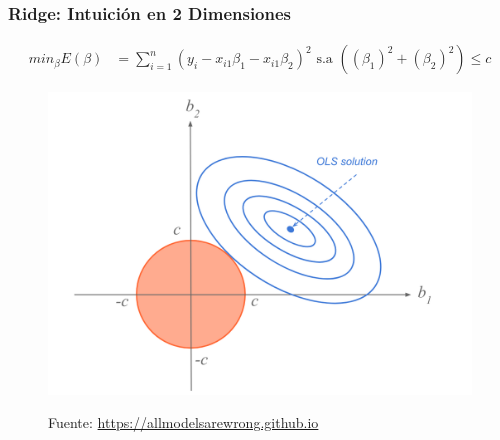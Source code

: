 \documentclass[
  shownotes,
  xcolor={svgnames},
  hyperref={colorlinks,citecolor=DarkBlue,linkcolor=andesred,urlcolor=DarkBlue}
  , aspectratio=169]{beamer}
\begin{document}
\begin{frame}[fragile]
\frametitle{Ridge: Intuición en 2 Dimensiones }

\begin{align}
     min_{\beta} E(\beta) &= \sum_{i=1}^n (y_i - x_{i1}\beta_1 - x_{i1}\beta_2)^2  \text{ s.a }   \left( (\beta_1)^2 + (\beta_2)^2 \right) \leq c 
  \end{align}

\begin{figure}[H] \centering
            \captionsetup{justification=centering}
              \includegraphics[scale=0.3]{figures/ridge3}
 
\tiny
Fuente: \url{https://allmodelsarewrong.github.io}
\end{figure}


\end{frame}
\end{document}
